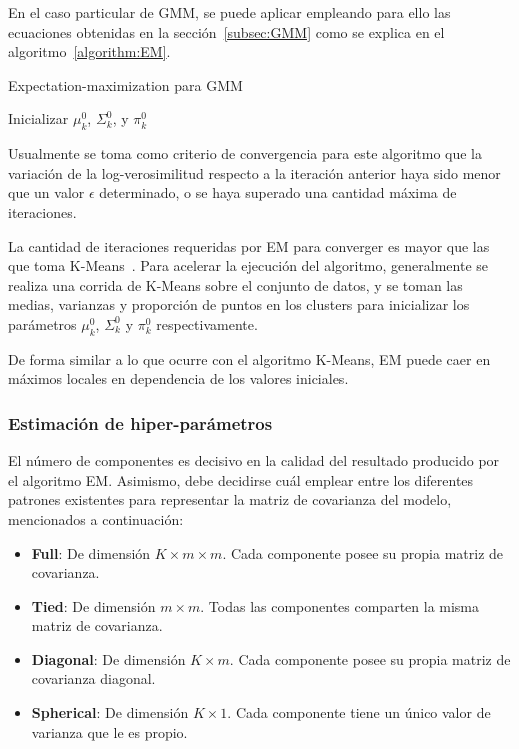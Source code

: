 En el caso particular de GMM, se puede aplicar empleando para ello las ecuaciones obtenidas en la sección~\ref{subsec:GMM} como se explica en el algoritmo~\ref{algorithm:EM}.

\begin{algorithm}
    \caption{Expectation-maximization para GMM}
    \label{algorithm:EM}
    Inicializar $\mu_k^0$, $\Sigma_k^0$, y $\pi_k^0$\;
\end{algorithm}

Usualmente se toma como criterio de convergencia para este algoritmo que la variación de la log-verosimilitud respecto a la iteración anterior haya sido menor que un valor $\epsilon$ determinado, o se haya superado una cantidad máxima de iteraciones.

La cantidad de iteraciones requeridas por EM para converger es mayor que las que toma K-Means~\cite{Park09}.
Para acelerar la ejecución del algoritmo, generalmente se realiza una corrida de K-Means sobre el conjunto de datos, y se toman las medias, varianzas y proporción de puntos en los clusters para inicializar los parámetros $\mu_k^0$, $\Sigma_k^0$ y $\pi_k^0$ respectivamente.

De forma similar a lo que ocurre con el algoritmo K-Means, EM puede caer en máximos locales en dependencia de los valores iniciales.

\subsubsection{Estimación de hiper-parámetros}

El número de componentes es decisivo en la calidad del resultado producido por el algoritmo EM\@.
Asimismo, debe decidirse cuál emplear entre los diferentes patrones existentes para representar la matriz de covarianza del modelo, mencionados a continuación:

\begin{itemize}
    \item \textbf{Full}: De dimensión $K\times m\times m$.
    Cada componente posee su propia matriz de covarianza.
    \item \textbf{Tied}: De dimensión $m\times m$.
    Todas las componentes comparten la misma matriz de covarianza.
    \item \textbf{Diagonal}: De dimensión $K\times m$.
    Cada componente posee su propia matriz de covarianza diagonal.
    \item \textbf{Spherical}: De dimensión $K\times 1$.
    Cada componente tiene un único valor de varianza que le es propio.
\end{itemize}

